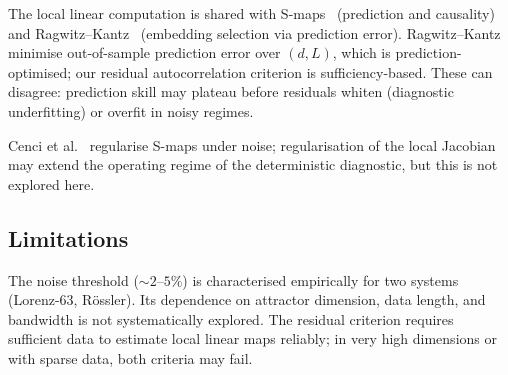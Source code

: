The local linear computation is shared with
S-maps~\cite{Sugihara1994, DeyleSugihara2011, CenciSugiharaSaavedra2019}
(prediction and causality) and Ragwitz--Kantz~\cite{RagwitzKantz2002}
(embedding selection via prediction error).  Ragwitz--Kantz
minimise out-of-sample prediction error over $(d, L)$, which is
prediction-optimised; our residual autocorrelation criterion is
sufficiency-based.  These can disagree: prediction skill may
plateau before residuals whiten (diagnostic underfitting) or
overfit in noisy regimes.

Cenci et al.~\cite{CenciSugiharaSaavedra2019} regularise S-maps
under noise; regularisation of the local Jacobian may extend the
operating regime of the deterministic diagnostic, but this is not
explored here.

\subsection*{Limitations}

The noise threshold ($\sim 2$--$5\%$) is characterised empirically
for two systems (Lorenz-63, R\"{o}ssler).  Its dependence on
attractor dimension, data length, and bandwidth is not
systematically explored.  The residual criterion requires
sufficient data to estimate local linear maps reliably; in very
high dimensions or with sparse data, both criteria may fail.



